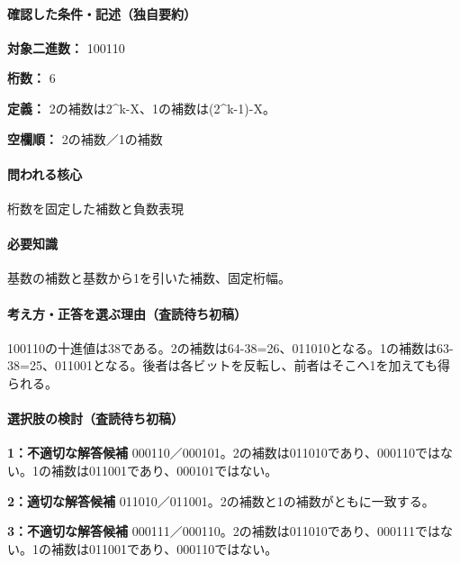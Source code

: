 \paragraph{確認した条件・記述（独自要約）}\mbox{}\par

\noindent\textbf{対象二進数：} 100110\par

\noindent\textbf{桁数：} 6\par

\noindent\textbf{定義：} 2の補数は2\textasciicircum{}k-X、1の補数は(2\textasciicircum{}k-1)-X。\par

\noindent\textbf{空欄順：} 2の補数／1の補数\par

\paragraph{問われる核心} 桁数を固定した補数と負数表現

\paragraph{必要知識} 基数の補数と基数から1を引いた補数、固定桁幅。

\paragraph{考え方・正答を選ぶ理由（査読待ち初稿）} 100110の十進値は38である。2の補数は64-38=\allowbreak{}26、011010となる。1の補数は63-38=\allowbreak{}25、011001となる。後者は各ビットを反転し、前者はそこへ1を加えても得られる。

\paragraph{選択肢の検討（査読待ち初稿）}\mbox{}\par

\noindent\textbf{1：不適切な解答候補} 000110／000101。2の補数は011010であり、000110ではない。1の補数は011001であり、000101ではない。\par

\noindent\textbf{2：適切な解答候補} 011010／011001。2の補数と1の補数がともに一致する。\par

\noindent\textbf{3：不適切な解答候補} 000111／000110。2の補数は011010であり、000111ではない。1の補数は011001であり、000110ではない。\par

